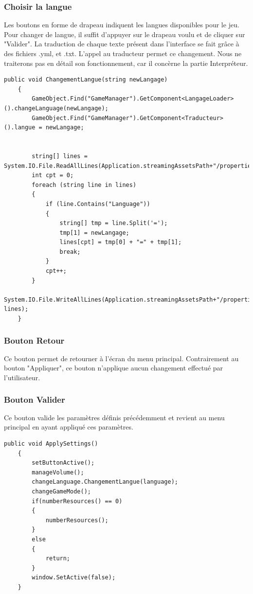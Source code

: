 \documentclass{report}
\begin{document}
\subsubsection{Choisir la langue}
Les boutons en forme de drapeau indiquent les langues disponibles pour le jeu. Pour changer de langue, il suffit d'appuyer sur le drapeau voulu et de cliquer sur "Valider".
La traduction de chaque texte présent dans l'interface se fait grâce à des fichiers .yml, et .txt.
L'appel au traducteur permet ce changement. 
Nous ne traiterons pas en détail son fonctionnement, car il concèrne la partie Interpréteur.
\begin{lstlisting}[language={[Sharp]C},label={lst:ChangementLangue(string newLangage)}, caption= Extrait du code de ChangeLanguage.cs]
public void ChangementLangue(string newLangage)
    {
        GameObject.Find("GameManager").GetComponent<LangageLoader>().changeLanguage(newLangage);
        GameObject.Find("GameManager").GetComponent<Traducteur>().langue = newLangage;
        

        string[] lines = System.IO.File.ReadAllLines(Application.streamingAssetsPath+"/properties.yml");
        int cpt = 0;
        foreach (string line in lines)
        {
            if (line.Contains("Language"))
            {
                string[] tmp = line.Split('=');
                tmp[1] = newLangage;
                lines[cpt] = tmp[0] + "=" + tmp[1];
                break;
            }
            cpt++;
        }
        System.IO.File.WriteAllLines(Application.streamingAssetsPath+"/properties.yml", lines);
    }
\end{lstlisting}

\subsubsection{Bouton Retour}
Ce bouton permet de retourner à l'écran du menu principal.
Contrairement au bouton "Appliquer", ce bouton n'applique aucun changement effectué par l'utilisateur.

\subsubsection{Bouton Valider}
Ce bouton valide les paramètres définis précédemment et revient au menu principal en ayant appliqué ces paramètres.

\begin{lstlisting}[language={[Sharp]C},label={lst:ApplySettings()}, caption= Extrait du code de SettingsButton.cs]
public void ApplySettings()
    {
        setButtonActive();
        manageVolume();
        changeLanguage.ChangementLangue(language);
        changeGameMode();
        if(numberResources() == 0)
        {
            numberResources();
        }
        else
        {
            return;
        }
        window.SetActive(false);
    }
\end{lstlisting}
\end{document}
